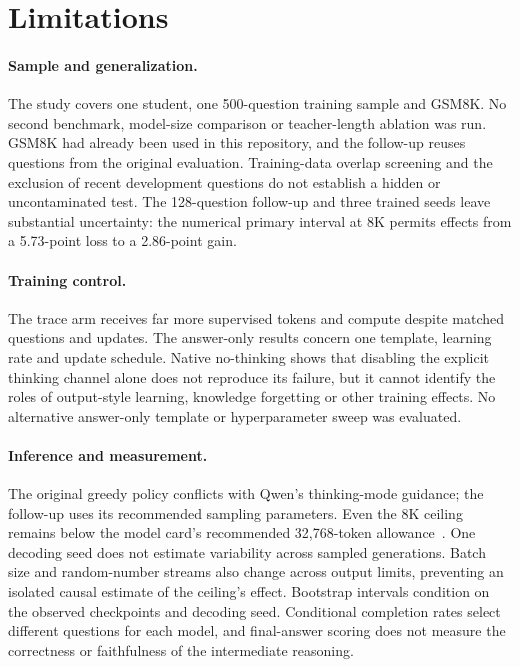 \documentclass[11pt]{article}
\begin{document}
\section{Limitations}
\paragraph{Sample and generalization.}
The study covers one student, one 500-question training sample and GSM8K. No second benchmark, model-size comparison or teacher-length ablation was run. GSM8K had already been used in this repository, and the follow-up reuses questions from the original evaluation. Training-data overlap screening and the exclusion of recent development questions do not establish a hidden or uncontaminated test. The 128-question follow-up and three trained seeds leave substantial uncertainty: the numerical primary interval at 8K permits effects from a 5.73-point loss to a 2.86-point gain.

\paragraph{Training control.}
The trace arm receives far more supervised tokens and compute despite matched questions and updates. The answer-only results concern one template, learning rate and update schedule. Native no-thinking shows that disabling the explicit thinking channel alone does not reproduce its failure, but it cannot identify the roles of output-style learning, knowledge forgetting or other training effects. No alternative answer-only template or hyperparameter sweep was evaluated.

\paragraph{Inference and measurement.}
The original greedy policy conflicts with Qwen's thinking-mode guidance; the follow-up uses its recommended sampling parameters. Even the 8K ceiling remains below the model card's recommended 32,768-token allowance~\cite{qwen}. One decoding seed does not estimate variability across sampled generations. Batch size and random-number streams also change across output limits, preventing an isolated causal estimate of the ceiling's effect. Bootstrap intervals condition on the observed checkpoints and decoding seed. Conditional completion rates select different questions for each model, and final-answer scoring does not measure the correctness or faithfulness of the intermediate reasoning.
\end{document}
